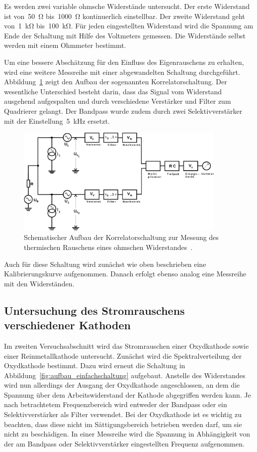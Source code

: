 Es werden zwei variable ohmsche Widerstände untersucht. Der erste Widerstand ist
von~\SI{50}{\ohm} bis~\SI{1000}{\ohm} kontinuerlich einstellbar. Der zweite
Widerstand geht von~\SI{1}{\kilo\ohm} bis~\SI{100}{\kilo\ohm}. Für jeden
eingestellten Widerstand wird die Spannung am Ende der Schaltung mit Hilfe des
Voltmeters gemessen. Die Widerstände selbst werden mit einem Ohmmeter bestimmt.

Um eine bessere Abschätzung für den Einfluss des Eigenrauschens zu erhalten,
wird eine weitere Messreihe mit einer abgewandelten Schaltung durchgeführt.
Abbildung~\ref{fig:aufbau_korrelatorschaltung} zeigt den Aufbau der sogenannten
Korrelatorschaltung. Der wesentliche Unterschied besteht darin, dass das Signal
vom Widerstand ausgehend aufgespalten und durch verschiedene Verstärker und
Filter zum Quadrierer gelangt. Der Bandpass wurde zudem durch zwei
Selektivverstärker mit der Einstellung~\SI{5}{\kilo\hertz} ersetzt.

\begin{figure}
  \centering
  \includegraphics[width=0.9\textwidth]{figures/aufbau_korrelatorschaltung.pdf}
  \caption{Schematischer Aufbau der Korrelatorschaltung zur Messung des
  thermischen Rauschens eines ohmschen Widerstandes~\cite{V57}.}
  \label{fig:aufbau_korrelatorschaltung}
\end{figure}

Auch für diese Schaltung wird zunächst wie oben beschrieben eine
Kalibrierungskurve aufgenommen. Danach erfolgt ebenso analog eine Messreihe mit
den Widerständen.

\subsection{Untersuchung des Stromrauschens verschiedener Kathoden}

Im zweiten Versuchsabschnitt wird das Stromrauschen einer Oxydkathode sowie
einer Reinmetallkathode untersucht. Zunächst wird die Spektralverteilung der
Oxydkathode bestimmt. Dazu wird erneut die Schaltung in
Abbildung~\ref{fig:aufbau_einfachschaltung} aufgebaut. Anstelle des Widerstandes
wird nun allerdings der Ausgang der Oxydkathode angeschlossen, an dem die
Spannung über dem Arbeitswiderstand der Kathode abgegriffen werden kann. Je nach
betrachtetem Frequenzbereich wird entweder der Bandpass oder ein
Selektivverstärker als Filter verwendet. Bei der Oxydkathode ist es wichtig zu
beachten, dass diese nicht im Sättigungsbereich betrieben werden darf, um sie
nicht zu beschädigen. In einer Messreihe wird die Spannung in Abhängigkeit von
der am Bandpass oder Selektivverstärker eingestellten Frequenz aufgenommen.

